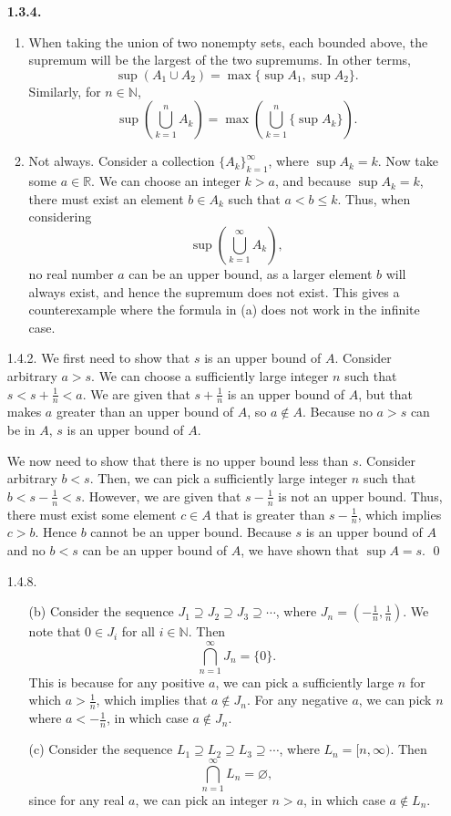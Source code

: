 \documentclass[11pt,letterpaper]{article}
\newcommand{\N}{\mathbb{N}}
\begin{document}
\begin{enumerate}
\item[\textbf{1.3.4.}]
\begin{enumerate}
    \item When taking the union of two nonempty sets, each bounded above, the supremum will be the largest of the two supremums. In other terms,
    \[
        \sup(A_1 \cup A_2) = \max \{\sup A_1, \sup A_2\}.
    \]
    Similarly, for $n\in \N$,
    \[
        \sup \left( \bigcup_{k=1}^n A_k \right) = \max \left( \bigcup_{k=1}^n \{\sup A_k\} \right).
    \]
    \item Not always. Consider a collection $\{A_k\}_{k=1}^\infty$, where $\sup A_k = k$. Now take some $a \in \mathbb{R}$. We can choose an integer $k > a$, and because $\sup A_k = k$, there must exist an element $b\in A_k$ such that $a < b \leq k$. Thus, when considering
    \[
        \sup\left(\bigcup_{k=1}^\infty A_k\right),
    \]
    no real number $a$ can be an upper bound, as a larger element $b$ will always exist, and hence the supremum does not exist. This gives a counterexample where the formula in (a) does not work in the infinite case.
\end{enumerate}

\item[1.4.2.] We first need to show that $s$ is an upper bound of $A$. Consider arbitrary $a>s$. We can choose a sufficiently large integer $n$ such that $s < s+\frac{1}{n} < a$. We are given that $s+\frac{1}{n}$ is an upper bound of $A$, but that makes $a$ greater than an upper bound of $A$, so $a\notin A$. Because no $a>s$ can be in $A$, $s$ is an upper bound of $A$.

We now need to show that there is no upper bound less than $s$. Consider arbitrary $b<s$. Then, we can pick a sufficiently large integer $n$ such that $b < s - \frac{1}{n} < s$. However, we are given that $s - \frac{1}{n}$ is not an upper bound. Thus, there must exist some element $c\in A$ that is greater than $s - \frac{1}{n}$, which implies $c>b$. Hence $b$ cannot be an upper bound. Because $s$ is an upper bound of $A$ and no $b<s$ can be an upper bound of $A$, we have shown that $\sup A = s$. \qed
\item[1.4.8.]
    \begin{enumerate}
        \item[(b)] Consider the sequence $J_1 \supseteq J_2 \supseteq J_3 \supseteq \cdots$, where $J_n = \left( -\frac{1}{n}, \frac{1}{n} \right)$. We note that $0\in{J_i}$ for all $i\in \N$. Then
        \[\bigcap_{n=1}^\infty J_n = \{0\}.\]
        This is because for any positive $a$, we can pick a sufficiently large $n$ for which $a > \frac{1}{n}$, which implies that $a\notin J_n$. For any negative $a$, we can pick $n$ where $a < -\frac{1}{n}$, in which case $a\notin J_n$.
        \item[(c)] Consider the sequence $L_1 \supseteq L_2 \supseteq L_3 \supseteq \cdots$, where $L_n = [n, \infty)$. Then
        \[\bigcap_{n=1}^\infty L_n = \varnothing,\]
        since for any real $a$, we can pick an integer $n>a$, in which case $a\notin L_n$.
    \end{enumerate}

\end{enumerate}
\end{document}
